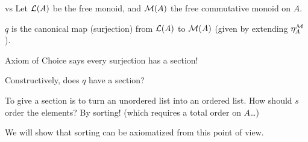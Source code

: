 \documentclass[9pt]{beamer}
\begin{document}
\begin{frame}{ vs }
Let $\mathcal{L}(A)$ be the \alert{free monoid}, and $\mathcal{M}(A)$ the \alert{free commutative monoid} on $A$.


$q$ is the \alert{canonical map} (surjection) from $\mathcal{L}(A)$ to $\mathcal{M}(A)$ (given by extending ${\eta_A^{\mathcal{M}}}$).

Axiom of Choice says every surjection has a section!

\begin{qblock}
    Constructively, does $q$ have a section?
\end{qblock}

To give a section is to turn an \alert{unordered list} into an \alert{ordered list}.
How should $s$ order the elements? By sorting! (which requires a \alert{total order} on $A$\ldots)

We will show that sorting can be axiomatized from this point of view.




    
\end{frame}
\end{document}
